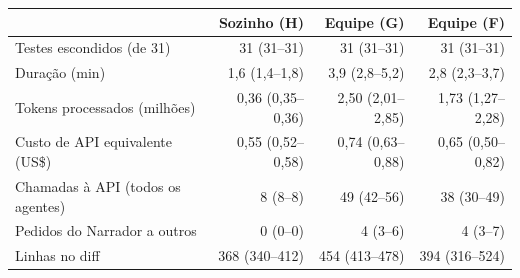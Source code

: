 \begin{tabular}{lrrr}
\toprule
 & Sozinho (H) & Equipe (G) & Equipe (F) \\
\midrule
Testes escondidos (de 31) & 31 (31--31) & 31 (31--31) & 31 (31--31) \\
Duração (min) & 1{,}6 (1{,}4--1{,}8) & 3{,}9 (2{,}8--5{,}2) & 2{,}8 (2{,}3--3{,}7) \\
Tokens processados (milhões) & 0{,}36 (0{,}35--0{,}36) & 2{,}50 (2{,}01--2{,}85) & 1{,}73 (1{,}27--2{,}28) \\
Custo de API equivalente (US\$) & 0{,}55 (0{,}52--0{,}58) & 0{,}74 (0{,}63--0{,}88) & 0{,}65 (0{,}50--0{,}82) \\
Chamadas à API (todos os agentes) & 8 (8--8) & 49 (42--56) & 38 (30--49) \\
Pedidos do Narrador a outros & 0 (0--0) & 4 (3--6) & 4 (3--7) \\
Linhas no diff & 368 (340--412) & 454 (413--478) & 394 (316--524) \\
\bottomrule
\end{tabular}
